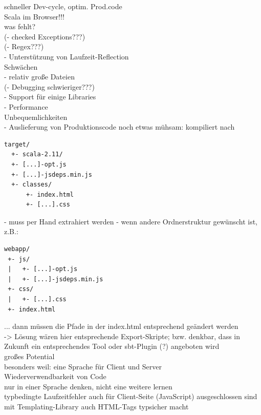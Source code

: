 \documentclass[a4paper, 12pt, hidelinks, listof=totoc, listoftables=totoc, bibliography=totoc]{scrreprt}
\begin{document}
  schneller Dev-cycle, optim. Prod.code \\
  
  Scala im Browser!!! \\
  
  
was fehlt? \\
  (- checked Exceptions???) \\
  (- Regex???) \\
  - Unterstützung von Laufzeit-Reflection \\

Schwächen \\
  - relativ große Dateien \\
  (- Debugging schwieriger???) \\
  - Support für einige Libraries \\
  - Performance \\
  
Unbequemlichkeiten \\
  - Auslieferung von Produktionscode noch etwas mühsam: kompiliert nach \\
\begin{lstlisting}
target/
  +- scala-2.11/
  +- [...]-opt.js
  +- [...]-jsdeps.min.js
  +- classes/
      +- index.html
      +- [...].css
\end{lstlisting}
  - muss per Hand extrahiert werden
  - wenn andere Ordnerstruktur gewünscht ist, z.B.:
\begin{lstlisting}
webapp/
 +- js/
 |   +- [...]-opt.js
 |   +- [...]-jsdeps.min.js
 +- css/
 |   +- [...].css
 +- index.html
\end{lstlisting}
  ... dann müssen die Pfade in der index.html entsprechend geändert werden \\
  -> Lösung wären hier entsprechende Export-Skripte; bzw. denkbar, dass in Zukunft ein entsprechendes Tool oder sbt-Plugin (?) angeboten wird \\



großes Potential \\
	besonders weil: eine Sprache für Client und Server \\
		Wiederverwendbarkeit von Code \\
		nur in einer Sprache denken, nicht eine weitere lernen \\
	typbedingte Laufzeitfehler auch für Client-Seite (JavaScript) ausgeschlossen sind \\
	mit Templating-Library auch HTML-Tags typsicher macht \\
	
\end{document}
